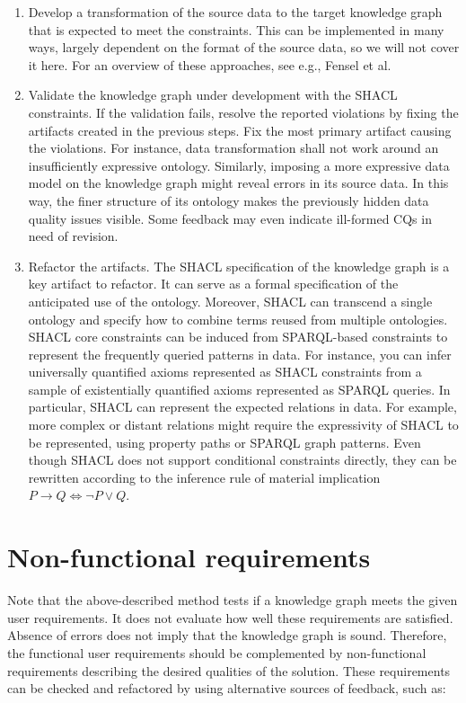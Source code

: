 \documentclass[
]{ceurart}
\begin{document}
\begin{enumerate}
    \item Develop a transformation of the source data to the target knowledge graph that is expected to meet the constraints. This can be implemented in many ways, largely dependent on the format of the source data, so we will not cover it here. For an overview of these approaches, see e.g., Fensel et al. \cite{Fensel2020b}
    \item Validate the knowledge graph under development with the SHACL constraints. If the validation fails, resolve the reported violations by fixing the artifacts created in the previous steps. Fix the most primary artifact causing the violations. For instance, data transformation shall not work around an insufficiently expressive ontology. Similarly, imposing a more expressive data model on the knowledge graph might reveal errors in its source data. In this way, the finer structure of its ontology makes the previously hidden data quality issues visible. Some feedback may even indicate ill-formed CQs in need of revision.
    \item Refactor the artifacts. The SHACL specification of the knowledge graph is a key artifact to refactor. It can serve as a formal specification of the anticipated use of the ontology. Moreover, SHACL can transcend a single ontology and specify how to combine terms reused from multiple ontologies. SHACL core constraints can be induced from SPARQL-based constraints to represent the frequently queried patterns in data. For instance, you can infer universally quantified axioms represented as SHACL constraints from a sample of existentially quantified axioms represented as SPARQL queries. In particular, SHACL can represent the expected relations in data. For example, more complex or distant relations might require the expressivity of SHACL to be represented, using property paths or SPARQL graph patterns. Even though SHACL does not support conditional constraints directly, they can be rewritten according to the inference rule of material implication ${P\to Q\Leftrightarrow \neg P\lor Q}$.
\end{enumerate}

\section{Non-functional requirements}
Note that the above-described method tests if a knowledge graph meets the given user requirements. It does not evaluate how well these requirements are satisfied. Absence of errors does not imply that the knowledge graph is sound. Therefore, the functional user requirements should be complemented by non-functional requirements describing the desired qualities of the solution. These requirements can be checked and refactored by using alternative sources of feedback, such as:
\end{document}
